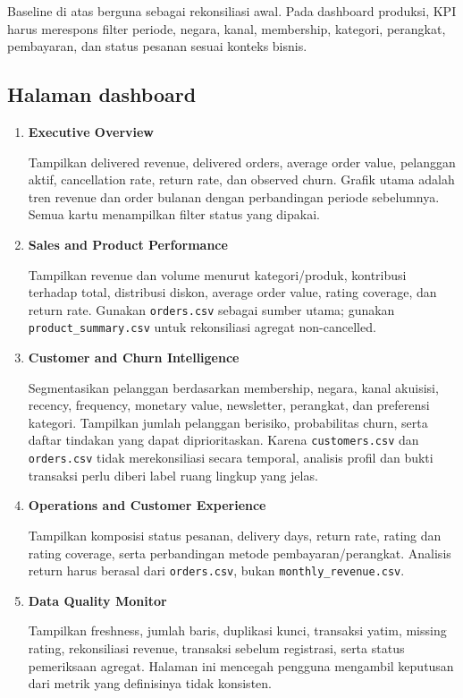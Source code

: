 \documentclass[
  indonesian,
  letterpaper,
  DIV=11,
  numbers=noendperiod]{scrreprt}
\begin{document}
Baseline di atas berguna sebagai rekonsiliasi awal. Pada dashboard
produksi, KPI harus merespons filter periode, negara, kanal, membership,
kategori, perangkat, pembayaran, dan status pesanan sesuai konteks
bisnis.

\subsection*{Halaman dashboard}\label{halaman-dashboard}

\begin{enumerate}
\def\labelenumi{\arabic{enumi}.}
\item
  \textbf{Executive Overview}

  Tampilkan delivered revenue, delivered orders, average order value,
  pelanggan aktif, cancellation rate, return rate, dan observed churn.
  Grafik utama adalah tren revenue dan order bulanan dengan perbandingan
  periode sebelumnya. Semua kartu menampilkan filter status yang
  dipakai.
\item
  \textbf{Sales and Product Performance}

  Tampilkan revenue dan volume menurut kategori/produk, kontribusi
  terhadap total, distribusi diskon, average order value, rating
  coverage, dan return rate. Gunakan \texttt{orders.csv} sebagai sumber
  utama; gunakan \texttt{product\_summary.csv} untuk rekonsiliasi
  agregat non-cancelled.
\item
  \textbf{Customer and Churn Intelligence}

  Segmentasikan pelanggan berdasarkan membership, negara, kanal
  akuisisi, recency, frequency, monetary value, newsletter, perangkat,
  dan preferensi kategori. Tampilkan jumlah pelanggan berisiko,
  probabilitas churn, serta daftar tindakan yang dapat diprioritaskan.
  Karena \texttt{customers.csv} dan \texttt{orders.csv} tidak
  merekonsiliasi secara temporal, analisis profil dan bukti transaksi
  perlu diberi label ruang lingkup yang jelas.
\item
  \textbf{Operations and Customer Experience}

  Tampilkan komposisi status pesanan, delivery days, return rate, rating
  dan rating coverage, serta perbandingan metode pembayaran/perangkat.
  Analisis return harus berasal dari \texttt{orders.csv}, bukan
  \texttt{monthly\_revenue.csv}.
\item
  \textbf{Data Quality Monitor}

  Tampilkan freshness, jumlah baris, duplikasi kunci, transaksi yatim,
  missing rating, rekonsiliasi revenue, transaksi sebelum registrasi,
  serta status pemeriksaan agregat. Halaman ini mencegah pengguna
  mengambil keputusan dari metrik yang definisinya tidak konsisten.
\end{enumerate}
\end{document}

